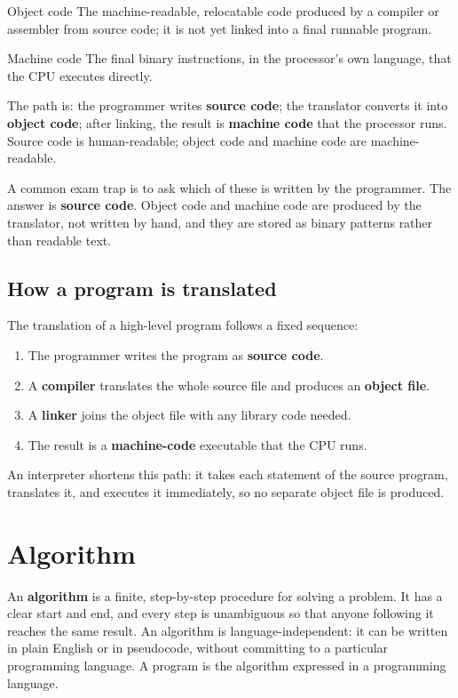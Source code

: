 \begin{definitionbox}{Object code}
The machine-readable, relocatable code produced by a compiler or assembler
from source code; it is not yet linked into a final runnable program.
\end{definitionbox}

\begin{definitionbox}{Machine code}
The final binary instructions, in the processor's own language, that the CPU
executes directly.
\end{definitionbox}

The path is: the programmer writes \textbf{source code}; the translator
converts it into \textbf{object code}; after linking, the result is
\textbf{machine code} that the processor runs. Source code is human-readable;
object code and machine code are machine-readable.

A common exam trap is to ask which of these is written by the programmer. The
answer is \textbf{source code}. Object code and machine code are produced by
the translator, not written by hand, and they are stored as binary patterns
rather than readable text.

\subsection*{How a program is translated}
The translation of a high-level program follows a fixed sequence:
\begin{enumerate}[label=\arabic*.]
  \item The programmer writes the program as \textbf{source code}.
  \item A \textbf{compiler} translates the whole source file and produces an
    \textbf{object file}.
  \item A \textbf{linker} joins the object file with any library code needed.
  \item The result is a \textbf{machine-code} executable that the CPU runs.
\end{enumerate}
An interpreter shortens this path: it takes each statement of the source
program, translates it, and executes it immediately, so no separate object
file is produced.

\section{Algorithm}
An \textbf{algorithm} is a finite, step-by-step procedure for solving a
problem. It has a clear start and end, and every step is unambiguous so that
anyone following it reaches the same result. An algorithm is
language-independent: it can be written in plain English or in pseudocode,
without committing to a particular programming language. A program is the
algorithm expressed in a programming language.

